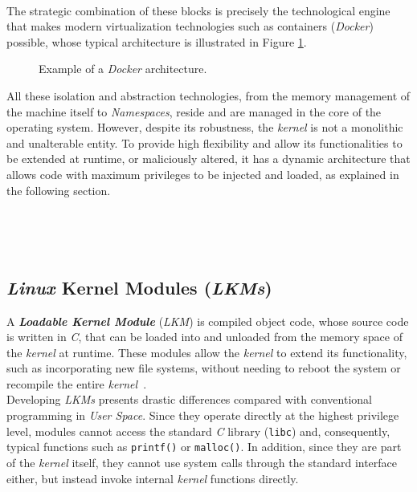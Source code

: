 \

The strategic combination of these blocks is precisely the technological engine that makes modern virtualization technologies such as containers (\textit{Docker}) possible,
whose typical architecture is illustrated in Figure \ref{fig:ns-docker}.

\begin{figure}[h!]
  \centering
  \scalebox{0.8}{}
  \caption{Example of a \textit{Docker} architecture.}
  \label{fig:ns-docker}
\end{figure}

All these isolation and abstraction technologies, from the memory management of the machine itself to \textit{Namespaces}, reside and are managed in the core of the operating system.
However, despite its robustness, the \textit{kernel} is not a monolithic and unalterable entity.
To provide high flexibility and allow its functionalities to be extended at runtime, or maliciously altered, it has a dynamic architecture that allows code with maximum privileges to be injected and loaded, as explained in the following section.

\

\

\subsection{\textit{Linux} Kernel Modules (\textit{LKMs})}
\label{sec:lkms}

A \textbf{\textit{Loadable Kernel Module}} (\textit{LKM}) is compiled object code, whose source code is written in \textit{C}, that can be loaded into and unloaded from the memory space of the \textit{kernel} at runtime.
These modules allow the \textit{kernel} to extend its functionality, such as incorporating new file systems, without needing to reboot the system or recompile the entire \textit{kernel}~\cite{geeks_lkm}.\\

Developing \textit{LKMs} presents drastic differences compared with conventional programming in \textit{User Space}.
Since they operate directly at the highest privilege level, modules cannot access the standard \textit{C} library (\texttt{libc}) and, consequently, typical functions such as \texttt{printf()} or \texttt{malloc()}.
In addition, since they are part of the \textit{kernel} itself, they cannot use system calls through the standard interface either, but instead invoke internal \textit{kernel} functions directly.\\

